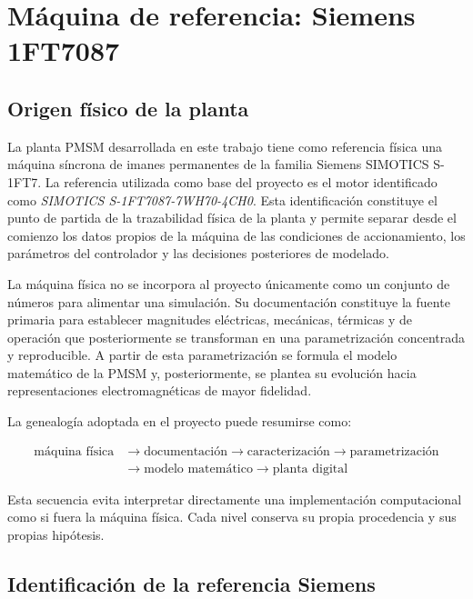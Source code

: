 \section{Máquina de referencia: Siemens 1FT7087}

\subsection{Origen físico de la planta}

La planta PMSM desarrollada en este trabajo tiene como referencia física una máquina síncrona de imanes permanentes de la familia Siemens SIMOTICS S-1FT7. La referencia utilizada como base del proyecto es el motor identificado como \textit{SIMOTICS S-1FT7087-7WH70-4CH0}. Esta identificación constituye el punto de partida de la trazabilidad física de la planta y permite separar desde el comienzo los datos propios de la máquina de las condiciones de accionamiento, los parámetros del controlador y las decisiones posteriores de modelado.

La máquina física no se incorpora al proyecto únicamente como un conjunto de números para alimentar una simulación. Su documentación constituye la fuente primaria para establecer magnitudes eléctricas, mecánicas, térmicas y de operación que posteriormente se transforman en una parametrización concentrada y reproducible. A partir de esta parametrización se formula el modelo matemático de la PMSM y, posteriormente, se plantea su evolución hacia representaciones electromagnéticas de mayor fidelidad.

La genealogía adoptada en el proyecto puede resumirse como:

\begin{equation}
\begin{aligned}
\text{máquina física}
&\rightarrow \text{documentación}
\rightarrow \text{caracterización}
\rightarrow \text{parametrización}
\\
&\rightarrow \text{modelo matemático}
\rightarrow \text{planta digital}
\end{aligned}
\end{equation}

Esta secuencia evita interpretar directamente una implementación computacional como si fuera la máquina física. Cada nivel conserva su propia procedencia y sus propias hipótesis.

\subsection{Identificación de la referencia Siemens}

